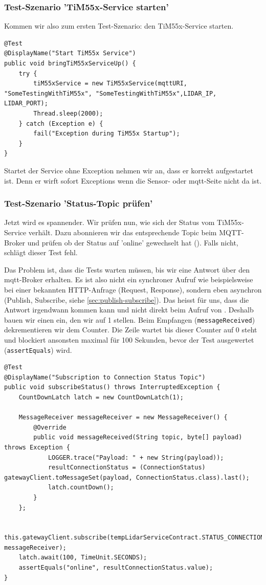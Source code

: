 \subsubsection{Test-Szenario 'TiM55x-Service starten'}
Kommen wir also zum ersten Test-Szenario: den TiM55x-Service starten.
\begin{lstlisting}[caption={TiM55x Startup-Test}]
@Test
@DisplayName("Start TiM55x Service")
public void bringTiM55xServiceUp() {
    try {
        tiM55xService = new TiM55xService(mqttURI, "SomeTestingWithTiM55x", "SomeTestingWithTiM55x",LIDAR_IP, LIDAR_PORT);
        Thread.sleep(2000);
    } catch (Exception e) {
        fail("Exception during TiM55x Startup");
    }
}
\end{lstlisting}
Startet der Service ohne Exception nehmen wir an, dass er korrekt aufgestartet ist. Denn er wirft sofort Exceptions wenn die Sensor- oder \acrshort{mqtt}-Seite nicht da ist.

\subsubsection{Test-Szenario 'Status-Topic prüfen'}
Jetzt wird es spannender. Wir prüfen nun, wie sich der Status vom TiM55x-Service verhält. Dazu abonnieren wir das entsprechende Topic beim MQTT-Broker und prüfen ob der Status auf  'online' gewechselt hat (). Falls nicht, schlägt dieser Test fehl.

Das Problem ist, dass die Tests warten müssen, bis wir eine Antwort über den \acrshort{mqtt}-Broker erhalten. Es ist also nicht ein synchroner Aufruf wie beispielsweise bei einer bekannten HTTP-Anfrage (Request, Response), sondern eben asynchron (Publish, Subscribe, siehe \ref{sec:publish-subscribe}). Das heisst für uns, dass die Antwort irgendwann kommen kann und nicht direkt beim Aufruf von . Deshalb bauen wir einen  ein, den wir auf 1 stellen. Beim Empfangen (\texttt{messageReceived}) dekrementieren wir dem Counter. Die Zeile  wartet bis dieser Counter auf 0 steht und blockiert ansonsten maximal für 100 Sekunden, bevor der Test ausgewertet (\texttt{assertEquals}) wird.

\begin{lstlisting}
@Test
@DisplayName("Subscription to Connection Status Topic")
public void subscribeStatus() throws InterruptedException {
    CountDownLatch latch = new CountDownLatch(1);

    MessageReceiver messageReceiver = new MessageReceiver() {
        @Override
        public void messageReceived(String topic, byte[] payload) throws Exception {
            LOGGER.trace("Payload: " + new String(payload));
            resultConnectionStatus = (ConnectionStatus) gatewayClient.toMessageSet(payload, ConnectionStatus.class).last();
            latch.countDown();
        }
    };

    this.gatewayClient.subscribe(tempLidarServiceContract.STATUS_CONNECTION, messageReceiver);
    latch.await(100, TimeUnit.SECONDS);
    assertEquals("online", resultConnectionStatus.value);
}
\end{lstlisting}

